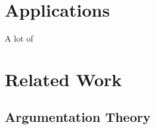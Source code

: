 



\section{Applications}
\label{sec:applications}
A lot of

\section{Related Work}
\subsection{Argumentation Theory}
\label{sec:argth}
